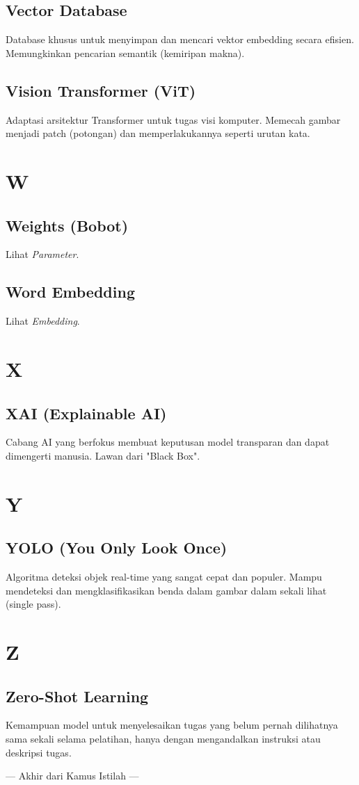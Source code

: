 \subsection*{Vector Database}
Database khusus untuk menyimpan dan mencari vektor embedding secara efisien. Memungkinkan pencarian semantik (kemiripan makna).

\subsection*{Vision Transformer (ViT)}
Adaptasi arsitektur Transformer untuk tugas visi komputer. Memecah gambar menjadi patch (potongan) dan memperlakukannya seperti urutan kata.

\section*{W}

\subsection*{Weights (Bobot)}
Lihat \textit{Parameter}.

\subsection*{Word Embedding}
Lihat \textit{Embedding}.

\section*{X}

\subsection*{XAI (Explainable AI)}
Cabang AI yang berfokus membuat keputusan model transparan dan dapat dimengerti manusia. Lawan dari "Black Box".

\section*{Y}

\subsection*{YOLO (You Only Look Once)}
Algoritma deteksi objek real-time yang sangat cepat dan populer. Mampu mendeteksi dan mengklasifikasikan benda dalam gambar dalam sekali lihat (single pass).

\section*{Z}

\subsection*{Zero-Shot Learning}
Kemampuan model untuk menyelesaikan tugas yang belum pernah dilihatnya sama sekali selama pelatihan, hanya dengan mengandalkan instruksi atau deskripsi tugas.

\vspace{2cm}
\begin{center}
--- Akhir dari Kamus Istilah ---
\end{center}
